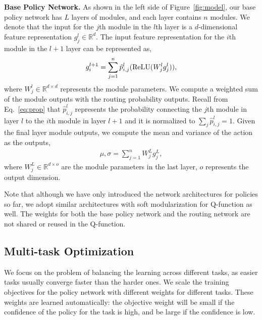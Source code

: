 \documentclass{article}
\begin{document}
\textbf{Base Policy Network.} As shown in the left side of Figure~\ref{fig:model}, our base policy network has $L$ layers of modules, and each layer contains $n$ modules. We denote that the input for the $j$th module in the $l$th layer is a $d$-dimensional feature representation $g_j^l \in \mathbb{R}^{d}$. The input feature representation for the $i$th module in the $l+1$ layer can be represented as,
\vspace{-0.1in}
\begin{align}
g_{i}^{l+1} = \sum_{j=1}^n \hat{p}^{l}_{i,j} ({\rm ReLU}(W_j^l g_j^l)),
\end{align}
where $W_j^l \in \mathbb{R}^{d \times d}$ represents the module parameters. We compute a weighted sum of the module outputs with the routing probability outputs. Recall from Eq.~\ref{eq:prop} that $\hat{p}^{l}_{i,j}$ represents the probability connecting the $j$th module in layer $l$ to the $i$th module in layer $l+1$ and it is normalized to $\sum_j \hat{p}^{l}_{i,j} = 1$. 
Given the final layer module outputs, we compute the mean and variance of the action as the outputs,
\vspace{-0.1in}
\begin{align}
\mu, \sigma = \sum_{j=1}^n W_j^L g_j^L,
\end{align}
where $W_j^L \in \mathbb{R}^{d \times o}$ are the module parameters in the last layer, $o$ represents the output dimension. 

Note that although we have only introduced the network architectures for policies so far, we adopt similar architectures with soft modularization for Q-function as well. The weights for both the base policy network and the routing network are not shared or reused in the Q-function. 


\vspace{-0.07in}
\subsection{Multi-task Optimization}
\vspace{-0.07in}

We focus on the problem of balancing the learning across different tasks, as easier tasks usually converge faster than the harder ones. We scale the training objectives for the policy network with different weights for different tasks. These weights are learned automatically: the objective weight will be small if the confidence of the policy for the task is high, and be large if the confidence is low. 
\end{document}
